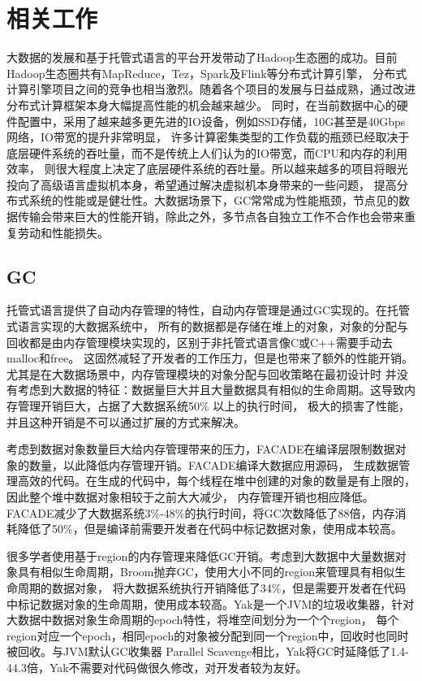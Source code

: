 
\chapter{相关工作}
大数据的发展和基于托管式语言的平台开发带动了Hadoop生态圈的成功。目前Hadoop生态圈共有MapReduce，Tez，Spark及Flink等分布式计算引擎，
分布式计算引擎项目之间的竞争也相当激烈。随着各个项目的发展与日益成熟，通过改进分布式计算框架本身大幅提高性能的机会越来越少。
同时，在当前数据中心的硬件配置中，采用了越来越多更先进的IO设备，例如SSD存储，10G甚至是40Gbps网络，IO带宽的提升非常明显，
许多计算密集类型的工作负载的瓶颈已经取决于底层硬件系统的吞吐量，而不是传统上人们认为的IO带宽，而CPU和内存的利用效率，
则很大程度上决定了底层硬件系统的吞吐量。所以越来越多的项目将眼光投向了高级语言虚拟机本身，希望通过解决虚拟机本身带来的一些问题，
提高分布式系统的性能或是健壮性。大数据场景下，GC常常成为性能瓶颈，节点见的数据传输会带来巨大的性能开销，除此之外，多节点各自独立工作不合作也会带来重复劳动和性能损失。

\section{GC}
托管式语言提供了自动内存管理的特性，自动内存管理是通过GC实现的。在托管式语言实现的大数据系统中，
所有的数据都是存储在堆上的对象，对象的分配与回收都是由内存管理模块实现的，区别于非托管式语言像C或C++需要手动去malloc和free。
这固然减轻了开发者的工作压力，但是也带来了额外的性能开销。尤其是在大数据场景中，内存管理模块的对象分配与回收策略在最初设计时
并没有考虑到大数据的特征：数据量巨大并且大量数据具有相似的生命周期。这导致内存管理开销巨大，占据了大数据系统50\% 以上的执行时间，
极大的损害了性能，并且这种开销是不可以通过扩展的方式来解决。

考虑到数据对象数量巨大给内存管理带来的压力，FACADE\cite{nguyen2015facade}在编译层限制数据对象的数量，以此降低内存管理开销。FACADE编译大数据应用源码，
生成数据管理高效的代码。在生成的代码中，每个线程在堆中创建的对象的数量是有上限的，因此整个堆中数据对象相较于之前大大减少，
内存管理开销也相应降低。FACADE减少了大数据系统3\%-48\%的执行时间，将GC次数降低了88倍，内存消耗降低了50\%，但是编译前需要开发者在代码中标记数据对象，使用成本较高。

很多学者使用基于region的内存管理来降低GC开销。考虑到大数据中大量数据对象具有相似生命周期，Broom\cite{gog2015broom}抛弃GC，使用大小不同的region来管理具有相似生命周期的数据对象，
将大数据系统执行开销降低了34\%，但是需要开发者在代码中标记数据对象的生命周期，使用成本较高。Yak\cite{nguyen2016yak}是一个JVM的垃圾收集器，针对大数据中数据对象生命周期的epoch特性，将堆空间划分为一个个region，
每个region对应一个epoch，相同epoch的对象被分配到同一个region中，回收时也同时被回收。与JVM默认GC收集器 Parallel Scavenge相比，Yak将GC时延降低了1.4-44.3倍，Yak不需要对代码做很久修改，对开发者较为友好。

